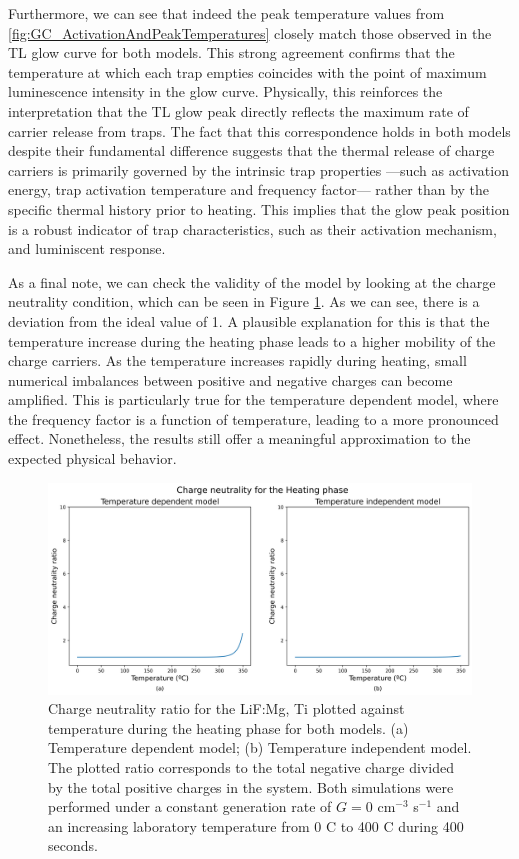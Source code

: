 \vspace{10pt}

Furthermore, we can see that indeed the peak temperature values from \ref{fig:GC_ActivationAndPeakTemperatures} closely match those observed in the TL glow curve for both models. This strong agreement confirms that the temperature at which each trap empties coincides with the point of maximum luminescence intensity in the glow curve. Physically, this reinforces the interpretation that the TL glow peak directly reflects the maximum rate of carrier release from traps. The fact that this correspondence holds in both models despite their fundamental difference suggests that the thermal release of charge carriers is primarily governed by the intrinsic trap properties ---such as activation energy, trap activation temperature and frequency factor--- rather than by the specific thermal history prior to heating. This implies that the glow peak position is a robust indicator of trap characteristics, such as their activation mechanism, and luminiscent response. 

\vspace{10pt}

As a final note, we can check the validity of the model by looking at the charge neutrality condition, which can be seen in Figure \ref{fig:heating_chneutrality}. As we can see, there is a deviation from the ideal value of 1. A plausible explanation for this is that the temperature increase during the heating phase leads to a higher mobility of the charge carriers. As the temperature increases rapidly during heating, small numerical imbalances between positive and negative charges can become amplified. This is particularly true for the temperature dependent model, where the frequency factor is a function of temperature, leading to a more pronounced effect. Nonetheless, the results still offer a meaningful approximation to the expected physical behavior.

\begin{figure}
    \centering
    \includegraphics[width=\textwidth]{Images/Heating Charge neutrality.png}
    \caption{Charge neutrality ratio for the LiF:Mg, Ti plotted against temperature during the heating phase for both models. (a) Temperature dependent model; (b) Temperature independent model. The plotted ratio corresponds to the total negative charge divided by the total positive charges in the system. Both simulations were performed under a constant generation rate of $G = 0$ cm$^{-3}$ s$^{-1}$ and an increasing laboratory temperature from 0 \textdegree C to 400 \textdegree C during 400 seconds.}
    \label{fig:heating_chneutrality}
\end{figure}